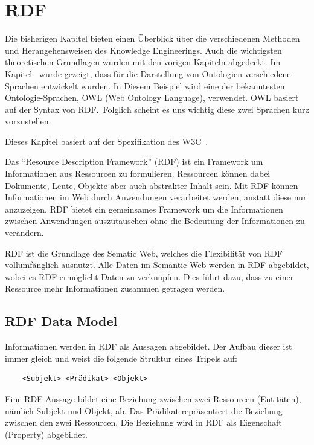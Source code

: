 \chapter{RDF}
\label{chap:rdf}
Die bisherigen Kapitel bieten einen Überblick über die verschiedenen Methoden und Herangehensweisen des Knowledge Engineerings. Auch die wichtigsten theoretischen Grundlagen wurden mit den vorigen Kapiteln abgedeckt. Im Kapitel~ wurde gezeigt, dass für die Darstellung von Ontologien verschiedene Sprachen entwickelt wurden. In Diesem Beispiel wird eine der bekanntesten Ontologie-Sprachen, OWL (Web Ontology Language), verwendet. OWL basiert auf der Syntax von RDF.\ Folglich scheint es uns wichtig diese zwei Sprachen kurz vorzustellen.

Dieses Kapitel basiert auf der Spezifikation des W3C~\cite{w3rdf}.

Das "`Resource Description Framework"' (RDF) ist ein Framework um Informationen aus Ressourcen zu formulieren. Ressourcen können dabei Dokumente, Leute, Objekte aber auch abstrakter Inhalt sein. Mit RDF können Informationen im Web durch Anwendungen verarbeitet werden, anstatt diese nur anzuzeigen. RDF bietet ein gemeinsames Framework um die Informationen zwischen Anwendungen auszutauschen ohne die Bedeutung der Informationen zu verändern.

RDF ist die Grundlage des Sematic Web, welches die Flexibilität von RDF vollumfänglich ausnutzt. Alle Daten im Semantic Web werden in RDF abgebildet, wobei es RDF ermöglicht Daten zu verknüpfen. Dies führt dazu, dass zu einer Ressource mehr Informationen zusammen getragen werden.\cite{cambSemRDF}

\section{RDF Data Model}
\label{sec:rdf_rdf_dataModel}
Informationen werden in RDF als Aussagen abgebildet. Der Aufbau dieser ist immer gleich und weist die folgende Struktur eines Tripels auf:

\begin{lstlisting}
    <Subjekt> <Prädikat> <Objekt>
\end{lstlisting}

Eine RDF Aussage bildet eine Beziehung zwischen zwei Ressourcen (Entitäten), nämlich Subjekt und Objekt, ab. Das Prädikat repräsentiert die Beziehung zwischen den zwei Ressourcen. Die Beziehung wird in RDF als Eigenschaft (Property) abgebildet.
 
